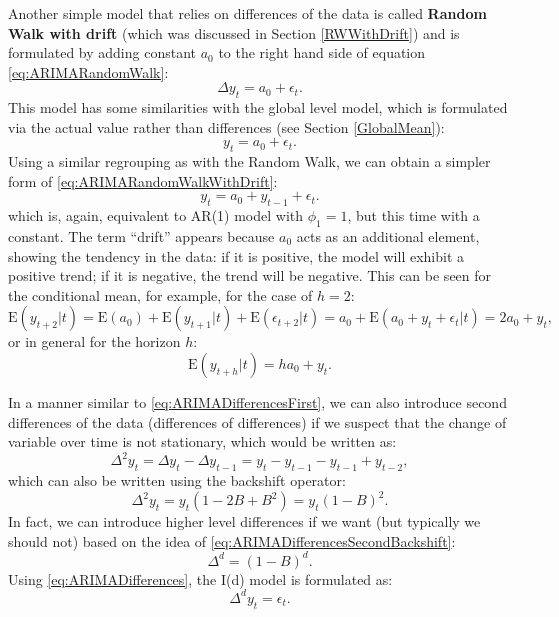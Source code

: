 \documentclass[
]{book}
\theoremstyle{definition}
\theoremstyle{definition}
\theoremstyle{definition}
\theoremstyle{definition}
\theoremstyle{remark}
\begin{document}
Another simple model that relies on differences of the data is called \textbf{Random Walk with drift} (which was discussed in Section \ref{RWWithDrift}) and is formulated by adding constant \(a_0\) to the right hand side of equation \eqref{eq:ARIMARandomWalk}:
\begin{equation}
  \Delta y_t = a_0 + \epsilon_t.
  \label{eq:ARIMARandomWalkWithDrift}
\end{equation}
This model has some similarities with the global level model, which is formulated via the actual value rather than differences (see Section \ref{GlobalMean}):
\begin{equation}
  {y}_{t} = a_0 + \epsilon_t.
  \label{eq:ARIMAGlobalMean}
\end{equation}
Using a similar regrouping as with the Random Walk, we can obtain a simpler form of \eqref{eq:ARIMARandomWalkWithDrift}:
\begin{equation}
  y_t = a_0 + y_{t-1} + \epsilon_t.
  \label{eq:ARIMARandomWalkWithDrift02}
\end{equation}
which is, again, equivalent to AR(1) model with \(\phi_1=1\), but this time with a constant. The term ``drift'' appears because \(a_0\) acts as an additional element, showing the tendency in the data: if it is positive, the model will exhibit a positive trend; if it is negative, the trend will be negative. This can be seen for the conditional mean, for example, for the case of \(h=2\):
\begin{equation}
  \mathrm{E}(y_{t+2}|t) = \mathrm{E}(a_0) + \mathrm{E}(y_{t+1}|t) + \mathrm{E}(\epsilon_{t+2}|t) = a_0 + \mathrm{E}(a_0 + y_t + \epsilon_t|t) = 2 a_0 + y_t ,
  \label{eq:ARIMARandomWalkWithDriftForecasth2}
\end{equation}
or in general for the horizon \(h\):
\begin{equation}
  \mathrm{E}(y_{t+h}|t) = h a_0 + y_t .
  \label{eq:ARIMARandomWalkWithDriftForecasth}
\end{equation}

In a manner similar to \eqref{eq:ARIMADifferencesFirst}, we can also introduce second differences of the data (differences of differences) if we suspect that the change of variable over time is not stationary, which would be written as:
\begin{equation}
  \Delta^2 y_t = \Delta y_t -\Delta y_{t-1} = y_t -y_{t-1} -y_{t-1} + y_{t-2},
  \label{eq:ARIMADifferencesSecond}
\end{equation}
which can also be written using the backshift operator:
\begin{equation}
  \Delta^2 y_t = y_t(1 -2B + B^2) = y_t (1 -B)^2.
  \label{eq:ARIMADifferencesSecondBackshift}
\end{equation}
In fact, we can introduce higher level differences if we want (but typically we should not) based on the idea of \eqref{eq:ARIMADifferencesSecondBackshift}:
\begin{equation}
  \Delta^d = (1-B)^d.
  \label{eq:ARIMADifferences}
\end{equation}
Using \eqref{eq:ARIMADifferences}, the I(d) model is formulated as:
\begin{equation}
  \Delta^d y_t = \epsilon_t.
  \label{eq:ARIMA0d0}
\end{equation}
\end{document}
